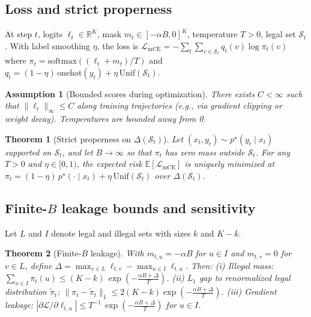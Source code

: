 \documentclass{article}
\newtheorem{assumption}{Assumption}
\newtheorem{theorem}{Theorem}
\begin{document}
\subsection{Loss and strict properness}
At step $t$, logits $\ell_t\in\mathbb{R}^K$, mask $m_t\in[-\alpha B,0]^K$, temperature $T>0$, legal set $\mathcal{S}_t$. With label smoothing $\eta$, the loss is
$\mathcal{L}_{\mathrm{mCE}}=-\sum_t \sum_{v\in\mathcal{S}_t} q_t(v) \log \pi_t(v)$
where $\pi_t=\mathrm{softmax}((\ell_t+m_t)/T)$ and $q_t=(1-\eta)\,\mathrm{onehot}(y_t)+\eta\,\mathrm{Unif}(\mathcal{S}_t)$.

\begin{assumption}[Bounded scores during optimization]\label{assump:bounded}
There exists $C<\infty$ such that $\|\ell_t\|_\infty\le C$ along training trajectories (e.g., via gradient clipping or weight decay). Temperatures are bounded away from 0.
\end{assumption}

\begin{theorem}[Strict properness on $\Delta(\mathcal{S}_t)$]\label{thm:proper}
Let $(x_t,y_t)\sim p^\star(y_t\mid x_t)$ supported on $\mathcal{S}_t$, and let $B\to\infty$ so that $\pi_t$ has zero mass outside $\mathcal{S}_t$. For any $T>0$ and $\eta\in[0,1)$, the expected risk $\mathbb{E}[\mathcal{L}_{\mathrm{mCE}}]$ is uniquely minimized at $\pi_t = (1-\eta)\,p^\star(\cdot\mid x_t) + \eta\,\mathrm{Unif}(\mathcal{S}_t)$ over $\Delta(\mathcal{S}_t)$.
\end{theorem}

\subsection{Finite-$B$ leakage bounds and sensitivity}
Let $L$ and $I$ denote legal and illegal sets with sizes $k$ and $K-k$.

\begin{theorem}[Finite-$B$ leakage]\label{thm:finiteB}
With $m_{t,u}=-\alpha B$ for $u\in I$ and $m_{t,v}=0$ for $v\in L$, define $\Delta=\max_{v\in L}\ell_{t,v}-\max_{u\in I}\ell_{t,u}$. Then:
(i) Illegal mass: $\sum_{u\in I}\pi_t(u) \le (K-k)\,\exp\!\left(-\frac{\alpha B + \Delta}{T}\right)$.
(ii) $L_1$ gap to renormalized legal distribution $\tilde{\pi}_t$: $\|\pi_t - \tilde{\pi}_t\|_1 \le 2(K-k)\exp\!\left(-\frac{\alpha B + \Delta}{T}\right)$.
(iii) Gradient leakage: $\left|\partial \mathcal{L}/\partial \ell_{t,u}\right| \le T^{-1}\,\exp\!\left(-\frac{\alpha B + \Delta}{T}\right)$ for $u\in I$.
\end{theorem}
\end{document}
